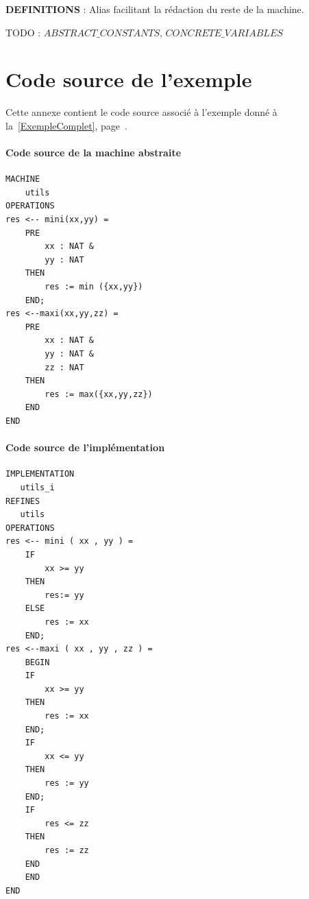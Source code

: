 \documentclass[10pt,a4paper]{article}
\begin{document}
\textbf{DEFINITIONS} : Alias facilitant la rédaction du reste de la machine.

TODO : $ABSTRACT\_CONSTANTS$, $CONCRETE\_VARIABLES$

\section{Code source de l'exemple}
\label{CodeSource}
Cette annexe contient le code source associé à l'exemple donné à la~\cref{ExempleComplet}, page~\pageref{ExempleComplet}.

\paragraph{Code source de la machine abstraite}
\begin{verbatim}
MACHINE
    utils
OPERATIONS
res <-- mini(xx,yy) =
    PRE
        xx : NAT &
        yy : NAT
    THEN
        res := min ({xx,yy})
    END;
res <--maxi(xx,yy,zz) =
    PRE
        xx : NAT &
        yy : NAT &
        zz : NAT
    THEN
        res := max({xx,yy,zz})
    END
END
\end{verbatim}

\paragraph{Code source de l'implémentation}
\begin{verbatim}
IMPLEMENTATION
   utils_i
REFINES
   utils
OPERATIONS
res <-- mini ( xx , yy ) =
    IF
        xx >= yy
    THEN
        res:= yy
    ELSE
        res := xx
    END;
res <--maxi ( xx , yy , zz ) =
    BEGIN
    IF
        xx >= yy
    THEN
        res := xx
    END;
    IF
        xx <= yy
    THEN
        res := yy
    END;
    IF
        res <= zz
    THEN
        res := zz
    END
    END
END
\end{verbatim}



\end{document}
